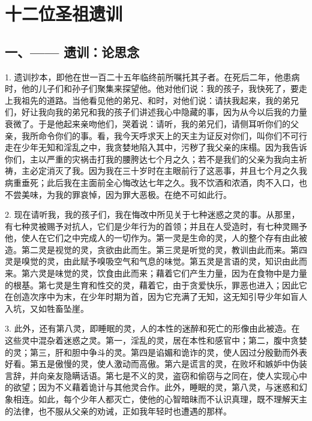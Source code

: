 
\chapter{十二位圣祖遗训}



\section{一、—— 遗训：论思念}

1. 遗训抄本，即他在世一百二十五年临终前所嘱托其子者。在死后二年，他患病时，他的儿子们和孙子们聚集来探望他。他对他们说：我的孩子，我快死了，要走上我祖先的道路。当他看见他的弟兄、和时，对他们说：请扶我起来，我的弟兄们，好让我向我的弟兄和我的孩子们讲述我心中隐藏的事，因为从今以后我的力量衰微了。于是他起来亲吻他们，哭着说：请听，我的弟兄们，请侧耳听你们的父亲，我所命令你们的事。看，我今天呼求天上的天主为证反对你们，叫你们不可行走在少年无知和淫乱之中，我贪婪地陷入其中，污秽了我父亲的床榻。因为我告诉你们，主以严重的灾祸击打我的腰胯达七个月之久；若不是我们的父亲为我向主祈祷，主必定消灭了我。因为我在三十岁时在主眼前行了这恶事，并且七个月之久我病重垂死；此后我在主面前全心悔改达七年之久。我不饮酒和浓酒，肉不入口，也不尝美味，为我的罪哀悼，因为罪大恶极。在绝不可如此行。\par

2. 现在请听我，我的孩子们，我在悔改中所见关于七种迷惑之灵的事。从那里，有七种灵被赐予对抗人，它们是少年行为的首领；并且在人受造时，有七种灵赐予他，使人在它们之中完成人的一切作为。第一灵是生命的灵，人的整个存有由此被造。第二灵是视觉的灵，贪欲由此而生。第三灵是听觉的灵，教训由此而来。第四灵是嗅觉的灵，由此赋予嗅吸空气和气息的味觉。第五灵是言语的灵，知识由此而来。第六灵是味觉的灵，饮食由此而来；藉着它们产生力量，因为在食物中是力量的根基。第七灵是生育和性交的灵，藉着它，由于贪爱快乐，罪恶也进入；因此它在创造次序中为末，在少年时期为首，因为它充满了无知，这无知引导少年如盲人入坑，又如牲畜坠崖。\par

3. 此外，还有第八灵，即睡眠的灵，人的本性的迷醉和死亡的形像由此被造。在这些灵中混杂着迷惑之灵。第一，淫乱的灵，居在本性和感官中；第二，腹中贪婪的灵；第三，肝和胆中争斗的灵。第四是谄媚和诡诈的灵，使人因过分殷勤而外表好看。第五是傲慢的灵，使人激动而高傲。第六是谎言的灵，在败坏和嫉妒中伪装言辞，并向亲友隐瞒话语。第七是不义的灵，盗窃和偷窃与之同在，使人实现心中的欲望；因为不义藉着诡计与其他灵合作。此外，睡眠的灵，第八灵，与迷惑和幻象相连。如此，每个少年人都灭亡，使他的心智暗昧而不认识真理，既不理解天主的法律，也不服从父亲的劝诫，正如我年轻时也遭遇的那样。\par

